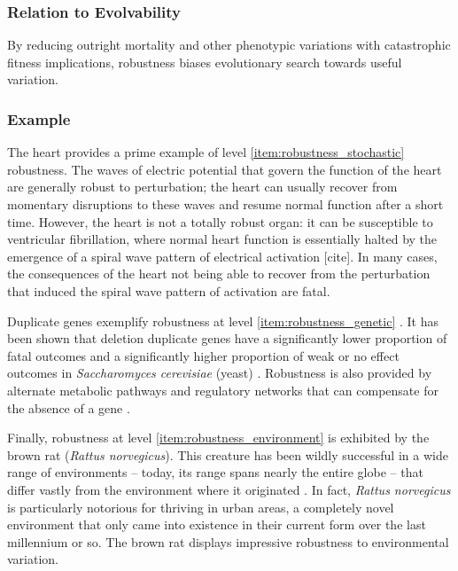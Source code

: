 \subsubsection{Relation to Evolvability}
By reducing outright mortality and other phenotypic variations with catastrophic fitness implications, robustness biases evolutionary search towards useful variation.\mindmapmark{\canalizationrobustness}

\subsubsection{Example}
The heart provides a prime example of level \ref{item:robustness_stochastic} robustness. The waves of electric potential that govern the function of the heart are generally robust to perturbation; the heart can usually recover from momentary disruptions to these waves and resume normal function after a short time. However, the heart is not a totally robust organ: it can be susceptible to ventricular fibrillation, where normal heart function is essentially halted by the emergence of a spiral wave pattern of electrical activation [cite]. In many cases, the consequences of the heart not being able to recover from the perturbation that induced the spiral wave pattern of activation are fatal.

Duplicate genes exemplify robustness at level \ref{item:robustness_genetic} \cite{Gu2003EvolutionMutations}. It has been shown that deletion duplicate genes have a significantly lower proportion of fatal outcomes and a significantly higher proportion of weak or no effect outcomes in \textit{Saccharomyces cerevisiae} (yeast) \cite{Gu2003EvolutionMutations}. Robustness is also provided by alternate metabolic pathways and regulatory networks that can compensate for the absence of a gene \cite{Gu2003EvolutionMutations}.

Finally, robustness at level \ref{item:robustness_environment} is exhibited by the brown rat (\textit{Rattus norvegicus}). This creature has been wildly successful in a wide range of environments -- today, its range spans nearly the entire globe -- that differ vastly from the environment where it originated \cite{Wikipediacontributors2016BrownRat}. In fact, \textit{Rattus norvegicus} is particularly notorious for thriving in urban areas, a completely novel environment that only came into existence in their current form over the last millennium or so. The brown rat displays impressive robustness to environmental variation.


